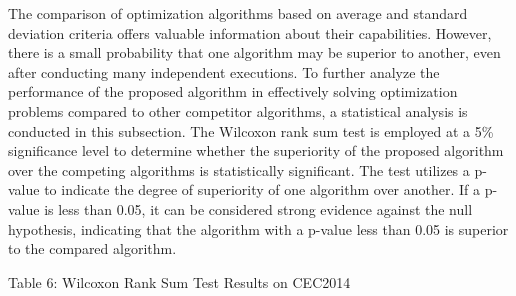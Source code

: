 \documentclass[
]{article}
\begin{document}
\begin{justify}
{The comparison of optimization algorithms based on average and standard deviation criteria offers valuable information about their capabilities. However, there is a small probability that one algorithm may be superior to another, even after conducting many independent executions. To further analyze the performance of the proposed algorithm in effectively solving optimization problems compared to other competitor algorithms, a statistical analysis is conducted in this subsection. The Wilcoxon rank sum test is employed at a 5\% significance level to determine whether the superiority of the proposed algorithm over the competing algorithms is statistically significant. The test utilizes a p-value to indicate the degree of superiority of one algorithm over another. If a p-value is less than 0.05, it can be considered strong evidence against the null hypothesis, indicating that the algorithm with a p-value less than 0.05 is superior to the compared algorithm.
\vspace{8mm}


\begin{center}
Table 6: Wilcoxon Rank Sum Test Results on CEC2014
\end{center}
\begin{table}[htbp]
\centering
  

\end{table}}
\end{justify}
\end{document}
